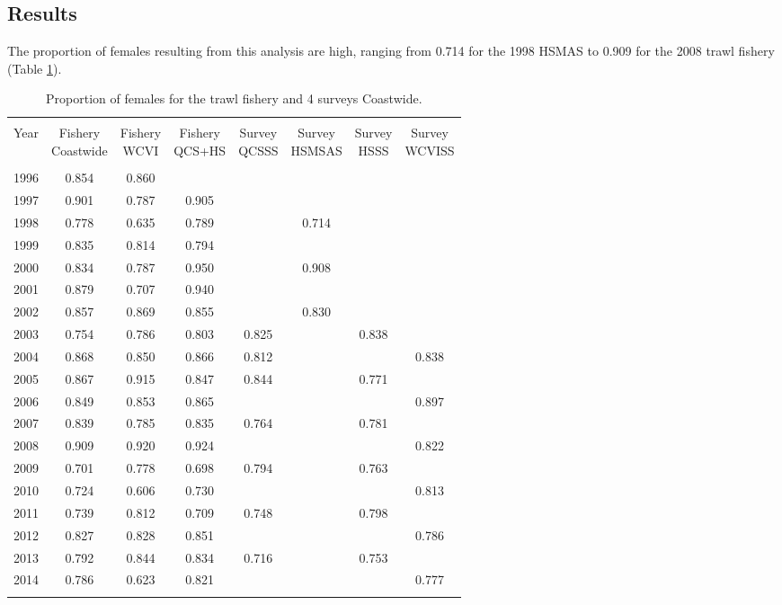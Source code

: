 \subsection{Results}
The proportion of females resulting from this analysis are high, ranging from 0.714 for the 1998 HSMAS to 0.909 for the 2008 trawl fishery (Table \ref{tab:propfemale}).
\clearpage
\begin{table}[h]
\centering
\caption{\label{tab:propfemale} Proportion of females for the trawl fishery and 4 surveys Coastwide.}
\begin{tabular}{lccccccc}
\hline \\
Year & \specialcell{Fishery\\Coastwide} & \specialcell{Fishery\\WCVI} & \specialcell{Fishery\\QCS+HS} & \specialcell{Survey\\QCSSS} & \specialcell{Survey\\HSMSAS} & \specialcell{Survey\\HSSS} & \specialcell{Survey\\WCVISS} \\
\hline \\
1996 & 0.854 & 0.860 &       &       &       &       & \\
1997 & 0.901 & 0.787 & 0.905 &       &       &       & \\
1998 & 0.778 & 0.635 & 0.789 &       & 0.714 &       & \\
1999 & 0.835 & 0.814 & 0.794 &       &       &       & \\
2000 & 0.834 & 0.787 & 0.950 &       & 0.908 &       & \\
2001 & 0.879 & 0.707 & 0.940 &       &       &       & \\
2002 & 0.857 & 0.869 & 0.855 &       & 0.830 &       & \\
2003 & 0.754 & 0.786 & 0.803 & 0.825 &       & 0.838 & \\
2004 & 0.868 & 0.850 & 0.866 & 0.812 &       &       & 0.838 \\
2005 & 0.867 & 0.915 & 0.847 & 0.844 &       & 0.771 & \\
2006 & 0.849 & 0.853 & 0.865 &       &       &       & 0.897 \\
2007 & 0.839 & 0.785 & 0.835 & 0.764 &       & 0.781 & \\
2008 & 0.909 & 0.920 & 0.924 &       &       &       & 0.822 \\
2009 & 0.701 & 0.778 & 0.698 & 0.794 &       & 0.763 & \\
2010 & 0.724 & 0.606 & 0.730 &       &       &       & 0.813 \\
2011 & 0.739 & 0.812 & 0.709 & 0.748 &       & 0.798 & \\
2012 & 0.827 & 0.828 & 0.851 &       &       &       & 0.786 \\
2013 & 0.792 & 0.844 & 0.834 & 0.716 &       & 0.753 & \\
2014 & 0.786 & 0.623 & 0.821 &       &       &       & 0.777 \\
\hline \\
\end{tabular}
\end{table}

\newpage
